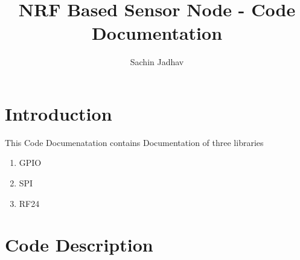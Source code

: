 \documentclass{article}
\begin{document}
\title
	{
		NRF Based Sensor Node - Code Documentation
	}
\author
	{
		Sachin Jadhav\\
	}

\maketitle
\section{Introduction}
This Code Documenatation contains Documentation of  three libraries
\begin{enumerate}
\item GPIO
\item SPI
\item RF24
\end{enumerate}
\section{Code Description}
\end{document}
